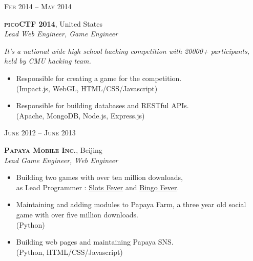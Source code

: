 \documentclass[10pt]{article}
\begin{document}
{\begin{minipage}[t]{0.5\textwidth}

{\raggedleft\textsc{Feb 2014 -- May 2014}\par}

{\raggedright\large \textbf{\textsc{picoCTF 2014}}, United States\\
\textit{Lead Web Engineer, Game Engineer}\\[5pt]}

\textit{It’s a national wide high school hacking competition with 20000+ participants, held by CMU hacking team.}
\begin{itemize}
	\item Responsible for creating a game for the competition. \\
	{\color{Mahogany}(Impact.js, WebGL, HTML/CSS/Javascript)}
	\item Responsible for building databases and RESTful APIs. \\
	{\color{Mahogany}(Apache, MongoDB, Node.js, Express.js)}
\end{itemize}


{\raggedleft\textsc{June 2012 -- June 2013}\par}

{\raggedright\large \textbf{\textsc{Papaya Mobile Inc.}}, Beijing\\
\textit{Lead Game Engineer, Web Engineer}\\[5pt]}

\begin{itemize}
	\item Building two games with over ten million downloads, \\
	as Lead Programmer : 
	\href{https://play.google.com/store/apps/details?id=com.kakapo.freeslots}{Slots Fever} and \href{https://play.google.com/store/apps/details?id=com.kakapo.bingo}{Bingo Fever}.
	\item Maintaining and adding modules to Papaya Farm, a three year old social game with over five million downloads. \\
	{\color{Mahogany}(Python)}
	\item Building web pages and maintaining Papaya SNS. \\
	{\color{Mahogany}(Python, HTML/CSS/Javascript)}
\end{itemize}


\end{minipage}}
\end{document}

